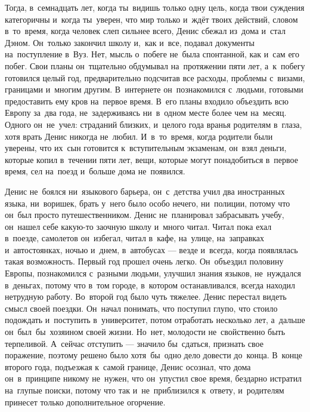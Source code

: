 Тогда, в~семнадцать лет, когда ты~видишь только одну цель, когда твои суждения категоричны и~когда ты~уверен, что мир только и~ждёт твоих действий, словом в~то~время, когда человек слеп сильнее всего, Денис сбежал из~дома и~стал Дэном.
Он~только закончил школу и,~как и~все, подавал документы на~поступление в~Вуз.
Нет, мысль о~побеге не~была спонтанной, как и~сам его побег.
Свои планы он~тщательно обдумывал на~протяжении пяти лет, а~к~побегу готовился целый год, предварительно подсчитав все расходы, проблемы с~визами, границами и~многим другим.
В~интернете он~познакомился с~людьми, готовыми предоставить ему кров на~первое время.
В~его планы входило объездить всю Европу за~два года, не~задерживаясь ни~в~одном месте более чем на~месяц.
Одного он~не~учел: страданий близких, и~целого года вранья родителям в~глаза, хотя врать Денис никогда не~любил.
И~в~то~время, когда родители были уверены, что их~сын готовится к~вступительным экзаменам, он~взял деньги, которые копил в~течении пяти лет, вещи, которые могут понадобиться в~первое время, сел на~поезд и~больше дома не~появился.

Денис не~боялся ни~языкового барьера, он~с~детства учил два иностранных языка, ни~воришек, брать у~него было особо нечего, ни~полиции, потому что он~был просто путешественником.
Денис не~планировал забрасывать учебу, он~нашел себе какую-то заочную школу и~много читал.
Читал пока ехал в~поезде, самолетов он~избегал, читал в~кафе, на~улице, на~заправках и~автостоянках, ночью и~днем, в~автобусах --- везде и~всегда, когда появлялась такая возможность.
Первый год прошел очень легко.
Он~объездил половину Европы, познакомился с~разными людьми, улучшил знания языков, не~нуждался в~деньгах, потому что в~том городе, в~котором останавливался, всегда находил нетрудную работу.
Во~второй год было чуть тяжелее.
Денис перестал видеть смысл своей поездки.
Он~начал понимать, что поступил глупо, что стоило подождать и~поступить в~университет, потом отработать несколько лет, а~дальше он~был~бы~хозяином своей жизни.
Но~нет, молодости не~свойственно быть терпеливой.
А~сейчас отступить --- значило бы~сдаться, признать свое поражение, поэтому решено было хотя~бы~одно дело довести до~конца.
В~конце второго года, подъезжая к~самой границе, Денис осознал, что дома он~в~принципе никому не~нужен, что он~упустил свое время, бездарно истратил на~глупые поиски, потому что так и~не~приблизился к~ответу, и~родителям принесет только дополнительное огорчение.

